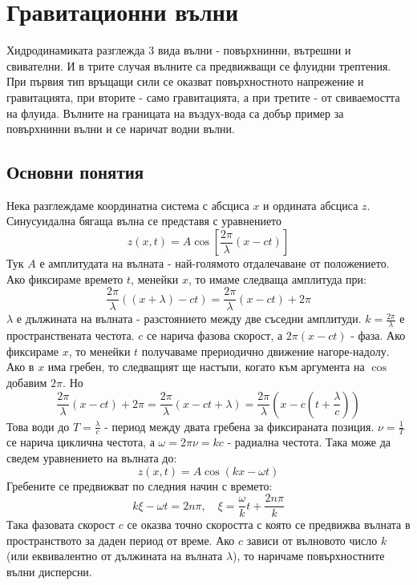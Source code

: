 \setcounter{equation}{0}
\section{Гравитационни вълни}
Хидродинамиката разглежда 3 вида вълни - повърхнинни, вътрешни и свивателни.
И в трите случая вълните са предвижващи се флуидни трептения.
При първия тип връщащи сили се оказват повърхностното напрежение и гравитацията,
при вторите - само гравитацията, а при третите - от свиваемостта на флуида.
Вълните на границата на въздух-вода са добър пример за повърхнинни вълни и се наричат водни вълни.

\subsection{Основни понятия}
Нека разглеждаме координатна система с абсциса $x$ и ордината абсциса $z$.
Синусуидална бягаща вълна се представя с уравнението
\begin{equation}
  z(x,t) = A \cos \left[\frac{2 \pi}{\lambda}(x - c t)\right]
\end{equation}
Тук $A$ е амплитудата на вълната - най-голямото отдалечаване от положението.
Ако фиксираме времето $t$, менейки $x$, то имаме следваща амплитуда при:
\begin{equation*}
  \frac{2 \pi}{\lambda}((x + \lambda) - c t) = \frac{2 \pi}{\lambda}(x - c t) + 2 \pi
\end{equation*}
$\lambda$ е дължината на вълната - разстоянието между две съседни амплитуди.
$k = \frac{2 \pi}{\lambda}$ е пространствената честота.
$c$ се нарича фазова скорост, а $2 \pi (x - c t)$ - фаза.
Ако фиксираме $x$, то менейки $t$ получаваме прериодично движение нагоре-надолу.
Ако в $x$ има гребен, то следващият ще настъпи, когато към аргумента на $\cos$ добавим $2 \pi$.
Но
\begin{equation*}
  \frac{2 \pi}{\lambda}(x - c t) + 2 \pi = \frac{2 \pi}{\lambda}(x - c t + \lambda) = \frac{2 \pi}{\lambda}(x - c (t + \frac{\lambda}{c}))
\end{equation*}
Това води до $T = \frac{\lambda}{c}$ - период между двата гребена за фиксираната позиция.
$\nu = \frac{1}{T}$ се нарича циклична честота, а $\omega = 2 \pi \nu = k c$ - радиална честота.
Така може да сведем уравнението на вълната до:
\begin{equation}
  z(x,t) = A \cos (k x - \omega t)
\end{equation}
Гребените се предвижват по следния начин с времето:
\begin{equation*}
  k \xi - \omega t = 2 n \pi, \quad \xi = \frac{\omega}{k} t + \frac{2 n \pi}{k}
\end{equation*}
Така фазовата скорост $c$ се оказва точно скоростта с която се предвижва вълната в пространството за даден период от време.
Ако $c$ зависи от вълновото число $k$ (или еквивалентно от дължината на вълната $\lambda$), то наричаме повърхностните вълни дисперсни.


